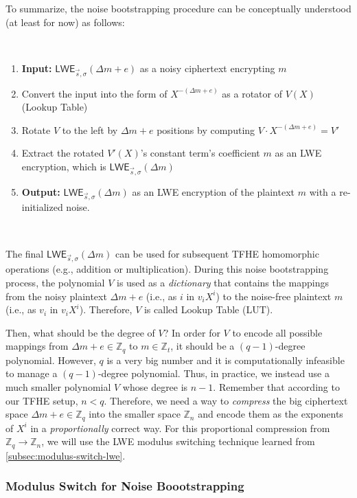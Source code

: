 To summarize, the noise bootstrapping procedure can be conceptually understood (at least for now) as follows: 

$ $

\begin{enumerate}
\item \textbf{Input:} $\textsf{LWE}_{\vec{s}, \sigma}(\Delta m + e)$ as a noisy ciphertext encrypting $m$
\item Convert the input into the form of $X^{-(\Delta m + e)}$ as a rotator of $V(X)$ (Lookup Table)
\item Rotate $V$ to the left by $\Delta m + e$ positions by computing $V \cdot X^{-(\Delta m + e)} = V'$
\item Extract the rotated $V'(X)$'s constant term's coefficient $m$ as an LWE encryption, which is $\textsf{LWE}_{\vec{s}, \sigma}(\Delta m)$
\item \textbf{Output:} $\textsf{LWE}_{\vec{s}, \sigma}(\Delta m)$ as an LWE encryption of the plaintext $m$ with a re-initialized noise. 
\end{enumerate}

$ $

The final $\textsf{LWE}_{\vec{s}, \sigma}(\Delta m)$ can be used for subsequent TFHE homomorphic operations (e.g., addition or multiplication). During this noise bootstrapping process, the polynomial $V$ is used as a \textit{dictionary} that contains the mappings from the noisy plaintext $\Delta m + e$ (i.e., as $i$ in $v_iX^i$) to the noise-free plaintext $m$ (i.e., as $v_i$ in $v_iX^i$). Therefore, $V$ is called Lookup Table (LUT). 

Then, what should be the degree of $V$? In order for $V$ to encode all possible mappings from $\Delta m + e \in \mathbb{Z}_q$ to $m \in \mathbb{Z}_t$, it should be a $(q-1)$-degree polynomial. However, $q$ is a very big number and it is computationally infeasible to manage a $(q-1)$-degree polynomial. Thus, in practice, we instead use a much smaller polynomial $V$ whose degree is $n-1$. Remember that according to our TFHE setup, $n < q$. Therefore, we need a way to \textit{compress} the big ciphertext space $\Delta m + e \in \mathbb{Z}_q$ into the smaller space $\mathbb{Z}_n$ and encode them as the exponents of $X^i$ in a \textit{proportionally} correct way. For this proportional compression from $\mathbb{Z}_q \rightarrow \mathbb{Z}_n$, we will use the LWE modulus switching technique learned from \autoref{subsec:modulus-switch-lwe}. 

\subsubsection{Modulus Switch for Noise Boootstrapping}
\label{subsec:bootstrapping-modulus-switch}


